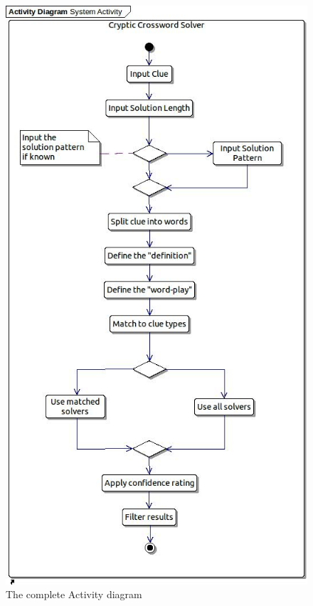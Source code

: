 \begin{figure}[H]
  \centering
  \includegraphics[scale=0.55]{design/activity/system_activity.jpg}
  \caption{The complete Activity diagram}
  \label{fig:system_activity}
\end{figure}


